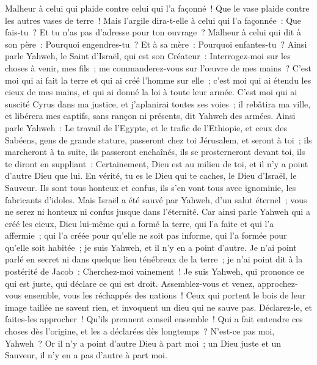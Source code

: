 \begin{multicols}{2}
Malheur à celui qui plaide contre celui qui l'a façonné~! Que le vase plaide contre les autres vases de terre~! Mais l'argile dira-t-elle à celui qui l'a façonnée~: Que fais-tu~? Et tu n'as pas d'adresse pour ton ouvrage~?
Malheur à celui qui dit à son père~: Pourquoi engendres-tu~? Et à sa mère~: Pourquoi enfantes-tu~?
Ainsi parle Yahweh, le Saint d'Israël, qui est son Créateur~: Interrogez-moi sur les choses à venir, mes fils~; me commanderez-vous sur l'œuvre de mes mains~?
C'est moi qui ai fait la terre et qui ai créé l'homme sur elle~; c'est moi qui ai étendu les cieux de mes mains, et qui ai donné la loi à toute leur armée.
C'est moi qui ai suscité Cyrus dans ma justice, et j'aplanirai toutes ses voies~; il rebâtira ma ville, et libérera mes captifs, sans rançon ni présents, dit Yahweh des armées.
Ainsi parle Yahweh~: Le travail de l'Egypte, et le trafic de l'Ethiopie, et ceux des Sabéens, gens de grande stature, passeront chez toi Jérusalem, et seront à toi~; ils marcheront à ta suite, ils passeront enchaînés, ils se prosterneront devant toi, ils te diront en suppliant~: Certainement, Dieu est au milieu de toi, et il n'y a point d'autre Dieu que lui.
En vérité, tu es le Dieu qui te caches, le Dieu d'Israël, le Sauveur.
Ils sont tous honteux et confus, ils s'en vont tous avec ignominie, les fabricants d'idoles.
Mais Israël a été sauvé par Yahweh, d'un salut éternel~; vous ne serez ni honteux ni confus jusque dans l'éternité.
Car ainsi parle Yahweh qui a créé les cieux, Dieu lui-même qui a formé la terre, qui l'a faite et qui l'a affermie~; qui l'a créée pour qu'elle ne soit pas informe, qui l'a formée pour qu'elle soit habitée~; je suis Yahweh, et il n'y en a point d'autre.
Je n'ai point parlé en secret ni dans quelque lieu ténébreux de la terre~; je n'ai point dit à la postérité de Jacob~: Cherchez-moi vainement~! Je suis Yahweh, qui prononce ce qui est juste, qui déclare ce qui est droit.
Assemblez-vous et venez, approchez-vous ensemble, vous les réchappés des nations~! Ceux qui portent le bois de leur image taillée ne savent rien, et invoquent un dieu qui ne sauve pas.
Déclarez-le, et faites-les approcher~! Qu'ils prennent conseil ensemble~! Qui a fait entendre ces choses dès l'origine, et les a déclarées dès longtemps~? N'est-ce pas moi, Yahweh~? Or il n'y a point d'autre Dieu à part moi~; un Dieu juste et un Sauveur, il n'y en a pas d'autre à part moi.

\end{multicols}
